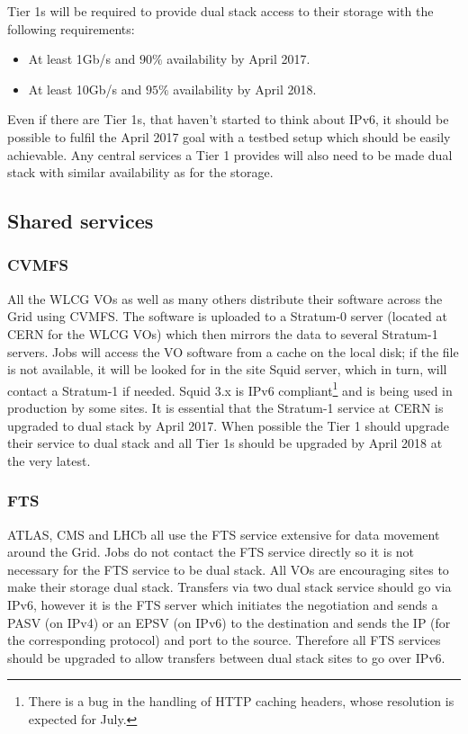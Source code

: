 \documentclass[11pt]{article}
\begin{document}
Tier 1s will be required to provide dual stack access to their storage with the following requirements:
\begin{itemize}
\item At least 1Gb/s and $90\%$ availability by April 2017.
\item At least 10Gb/s and $95\%$ availability by April 2018.
\end{itemize}
Even if there are Tier 1s, that haven't started to think about IPv6, it should be possible to fulfil the April 2017 goal with a testbed setup which should be easily achievable.  Any central services a Tier 1 provides will also need to be made dual stack with similar availability as for the storage.

\subsection{Shared services}
\subsubsection{CVMFS}
All the WLCG VOs as well as many others distribute their software across the Grid using CVMFS. The software is uploaded to a Stratum-0 server (located at CERN for the WLCG VOs) which then mirrors the data to several Stratum-1 servers\cite{Stratum1}.  Jobs will access the VO software from a cache on the local disk; if the file is not available, it will be looked for in the site Squid server, which in turn, will contact a Stratum-1 if needed.  Squid 3.x is IPv6 compliant\footnote{There is a bug in the handling of HTTP caching headers, whose resolution is expected for July.} and is being used in production by some sites.  It is essential that the Stratum-1 service at CERN is upgraded to dual stack by April 2017.  When possible the Tier 1 should upgrade their service to dual stack and all Tier 1s should be upgraded by April 2018 at the very latest.

\subsubsection{FTS}
ATLAS, CMS and LHCb all use the FTS service extensive for data movement around the Grid.  Jobs do not contact the FTS service directly so it is not necessary for the FTS service to be dual stack.  All VOs are encouraging sites to make their storage dual stack.  Transfers via two dual stack service should go via IPv6, however it is the FTS server which initiates the negotiation and sends a PASV (on IPv4) or an EPSV (on IPv6) to the destination and sends the IP (for the corresponding protocol) and port to the source.  Therefore all FTS services should be upgraded to allow transfers between dual stack sites to go over IPv6.  
\end{document}
